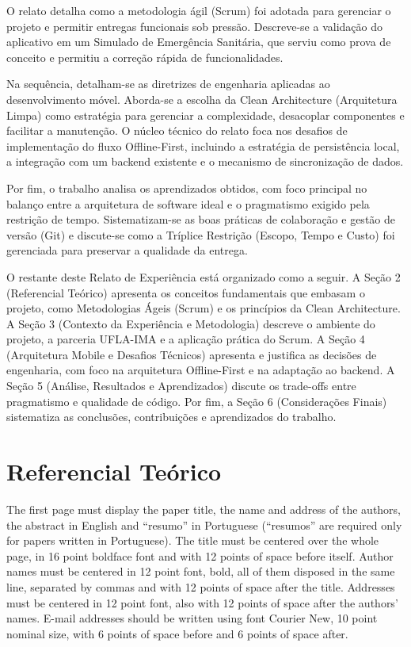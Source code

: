 \documentclass[12pt]{article}
\begin{document}
O relato detalha como a metodologia ágil (Scrum) foi adotada para gerenciar o projeto e permitir entregas funcionais sob pressão. Descreve-se a validação do aplicativo em um Simulado de Emergência Sanitária, que serviu como prova de conceito e permitiu a correção rápida de funcionalidades.

Na sequência, detalham-se as diretrizes de engenharia aplicadas ao desenvolvimento móvel. Aborda-se a escolha da Clean Architecture (Arquitetura Limpa) como estratégia para gerenciar a complexidade, desacoplar componentes e facilitar a manutenção. O núcleo técnico do relato foca nos desafios de implementação do fluxo Offline-First, incluindo a estratégia de persistência local, a integração com um backend existente e o mecanismo de sincronização de dados.

Por fim, o trabalho analisa os aprendizados obtidos, com foco principal no balanço entre a arquitetura de software ideal e o pragmatismo exigido pela restrição de tempo. Sistematizam-se as boas práticas de colaboração e gestão de versão (Git) e discute-se como a Tríplice Restrição (Escopo, Tempo e Custo) foi gerenciada para preservar a qualidade da entrega.

O restante deste Relato de Experiência está organizado como a seguir. A Seção 2 (Referencial Teórico) apresenta os conceitos fundamentais que embasam o projeto, como Metodologias Ágeis (Scrum) e os princípios da Clean Architecture. A Seção 3 (Contexto da Experiência e Metodologia) descreve o ambiente do projeto, a parceria UFLA-IMA e a aplicação prática do Scrum. A Seção 4 (Arquitetura Mobile e Desafios Técnicos) apresenta e justifica as decisões de engenharia, com foco na arquitetura Offline-First e na adaptação ao backend. A Seção 5 (Análise, Resultados e Aprendizados) discute os trade-offs entre pragmatismo e qualidade de código. Por fim, a Seção 6 (Considerações Finais) sistematiza as conclusões, contribuições e aprendizados do trabalho.

\section{Referencial Teórico} \label{sec:firstpage}

The first page must display the paper title, the name and address of the
authors, the abstract in English and ``resumo'' in Portuguese (``resumos'' are
required only for papers written in Portuguese). The title must be centered
over the whole page, in 16 point boldface font and with 12 points of space
before itself. Author names must be centered in 12 point font, bold, all of
them disposed in the same line, separated by commas and with 12 points of
space after the title. Addresses must be centered in 12 point font, also with
12 points of space after the authors' names. E-mail addresses should be
written using font Courier New, 10 point nominal size, with 6 points of space
before and 6 points of space after.
\end{document}

